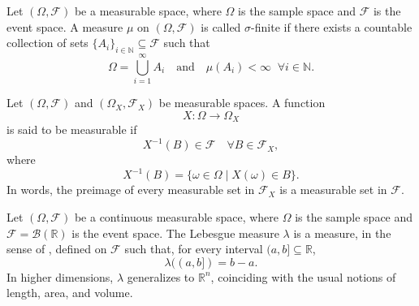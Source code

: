 \begin{definition}
	\label{def:sigma_finite_measure}
	Let $(\Omega, \mathcal{F})$ be a measurable space, where $\Omega$ is the sample space and $\mathcal{F}$ is the event space. A measure $\mu$ on $(\Omega, \mathcal{F})$ is called $\sigma$-finite if there exists a countable collection of sets $\{A_i\}_{i\in\mathbb{N}} \subseteq \mathcal{F}$ such that 
	\begin{equation}
		\Omega = \bigcup_{i=1}^\infty A_i
		\quad\text{and}\quad 
		\mu(A_i) < \infty \;\; \forall i\in\mathbb{N}.
	\end{equation}
\end{definition}

\begin{definition}
	\label{def:measurable_function}
	Let $(\Omega,\mathcal{F})$ and $(\Omega_X,\mathcal{F}_X)$ be measurable spaces. A function
	\begin{equation}
		X\colon \Omega \to \Omega_X
	\end{equation}
	is said to be measurable if
	\begin{equation}
		X^{-1}(B) \in \mathcal{F} \quad \forall B \in \mathcal{F}_X,
	\end{equation}
	where
	\begin{equation}
		X^{-1}(B) = \{\omega \in \Omega \mid X(\omega) \in B\}.
	\end{equation}
	In words, the preimage of every measurable set in $\mathcal{F}_X$ is a measurable set in $\mathcal{F}$.
\end{definition}

\begin{definition}
	\label{def:lebesgue_measure}
	Let $(\Omega, \mathcal{F})$ be a continuous measurable space, where $\Omega$ is the sample space and $\mathcal{F} = \mathcal{B}(\mathbb{R})$ is the event space. The Lebesgue measure $\lambda$ is a measure, in the sense of , defined on $\mathcal{F}$ such that, for every interval $(a,b] \subseteq \mathbb{R}$,
	\begin{equation}
		\lambda((a,b]) = b-a.
	\end{equation}
	In higher dimensions, $\lambda$ generalizes to $\mathbb{R}^n$, coinciding with the usual notions of length, area, and volume.
\end{definition}

